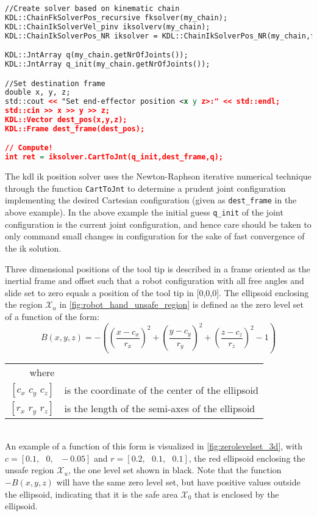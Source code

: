 \begin{lstlisting}[language=xml]
//Create solver based on kinematic chain
KDL::ChainFkSolverPos_recursive fksolver(my_chain);
KDL::ChainIkSolverVel_pinv iksolverv(my_chain);
KDL::ChainIkSolverPos_NR iksolver = KDL::ChainIkSolverPos_NR(my_chain,fksolver,iksolverv,100,1e-6);

KDL::JntArray q(my_chain.getNrOfJoints());
KDL::JntArray q_init(my_chain.getNrOfJoints());

//Set destination frame
double x, y, z;
std::cout << "Set end-effector position <x y z>:" << std::endl;
std::cin >> x >> y >> z;
KDL::Vector dest_pos(x,y,z);
KDL::Frame dest_frame(dest_pos);

// Compute!
int ret = iksolver.CartToJnt(q_init,dest_frame,q);
\end{lstlisting}

The \gls{kdl} \gls{ik} position solver uses the Newton-Raphson iterative numerical technique through the function \texttt{CartToJnt} to determine a prudent joint configuration implementing the desired Cartesian configuration (given as \texttt{dest\_frame} in the above example). In the above example the initial guess \texttt{q\_init} of the joint configuration is the current joint configuration, and hence care should be taken to only command small changes in configuration for the sake of fast convergence of the \gls{ik} solution.


Three dimensional positions of the tool tip is described in a frame oriented as the inertial frame and offset such that a robot configuration with all free angles and slide set to zero equals a position of the tool tip in [0,0,0].
The ellipsoid enclosing the region $\mathcal{X}_u$ in \autoref{fig:robot_hand_unsafe_region} is defined as the zero level set of a function of the form:
\begin{equation}
B(x,y,z) = -\left(  \left(\frac{x-c_x}{r_x}\right)^2 + \left(\frac{y-c_y}{r_y}\right)^2 + \left(\frac{z-c_z}{r_z}\right)^2 - 1 \right)
\end{equation}
\begin{tabular}{rl}
where&\\
$[c_x\,\, c_y\,\, c_z]$ & is the coordinate of the center of the ellipsoid\\
$[r_x\,\, r_y\,\, r_z]$ & is the length of the semi-axes of the ellipsoid\\
\end{tabular}\\

An example of a function of this form is visualized in \autoref{fig:zerolevelset_3d}, with $c= [0.1,\,\,\,\, 0,\,\,\,\, -0.05]$ and $r=[0.2,\,\,\,\, 0.1,\,\,\,\, 0.1]$, the red ellipsoid enclosing the unsafe region $\mathcal{X}_u$, the one level set shown in black. Note that the function $-B(x,y,z)$ will have the same zero level set, but have positive values outside the ellipsoid, indicating that it is the safe area $\mathcal{X}_0$ that is enclosed by the ellipsoid.

